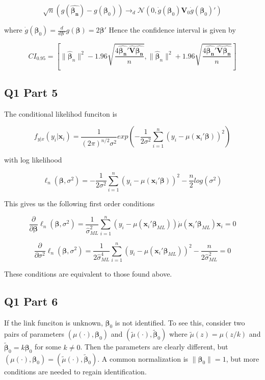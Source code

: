 \documentclass[11pt]{article}
\newcommand{\N}{\mathcal{N}}
\begin{document}
$$ \sqrt{n}(g(\hat{\bm{\beta_n}}) - g(\bm{\beta}_0)) \to_d \N (0, \dot{g}(\bm{\beta}_0) \bm{V}_0 \dot{g}(\bm{\beta}_0)')
$$

where $\dot{g}(\bm{\beta}_0) = \frac{d}{d\bm{\beta}'}g(\bm{\beta}) = 2 \bm{\beta}' $ Hence the confidence interval is given by 


$$ CI_{0.95} = \left[ \lVert \hat{\bm{\beta}}_n \rVert ^2 - 1.96 \sqrt{\frac{4\hat{\bm{\beta_n}}'\hat{\bm{V}} \hat{\bm{\beta_n}} }{n}},  \lVert \hat{\bm{\beta}}_n \rVert ^2 + 1.96 \sqrt{\frac{4\hat{\bm{\beta_n}}'\hat{\bm{V}} \hat{\bm{\beta_n}} }{n}} \right] 
$$

\subsection{Q1 Part 5}
The conditional likelihod funciton is 

$$f_{y|x}(y_i|\bm{x}_i) = \frac{1}{(2\pi)^{n/2} \sigma^2} exp \left( -\frac{1}{2 \sigma^2} \sum_{i=1}^{n}(y_i - \mu(\bm{x}_i'\bm{\beta}))^2 \right)
$$

with log likelihood 

$$ \ell_n(\bm{\beta}, \sigma^2) = -\frac{1}{2\sigma^2} \sum_{i=1}^{n}(y_i - \mu(\bm{x}_i' \bm{\beta}))^2 - \frac{n}{2}log(\sigma^2)
$$

This gives us the following first order conditions 

$$ \frac{\partial}{\partial \bm{\beta}} \ell_n(\bm{\beta}, \sigma^2) = \frac{1}{\hat{\sigma}_{ML}^2} \sum_{i=1}^{n}(y_i - \mu(\bm{x}_i' \bm{\beta}_{ML}))\dot{\mu}(\bm{x}_i' \bm{\beta}_{ML})\bm{x}_i = 0
$$

$$\frac{\partial}{\partial \sigma^2} \ell_n(\bm{\beta}, \sigma^2) =
\frac{1}{2\hat{\sigma}_{ML}^4} \sum_{i=1}^{n}(y_i - \mu(\bm{x}_i' \bm{\beta}_{ML}))^2 - \frac{n}{2 \hat{\sigma}_{ML}^2} =0
$$

These conditions are equivalent to those found above. 

\subsection{Q1 Part 6}
If the link funciton is unknown, $\bm{\beta}_0$ is not identified. To see this, consider two pairs of parameters $(\mu(\cdot), \bm{\beta}_0)$ and $(\tilde{\mu}(\cdot), \tilde{\bm{\beta}}_0)$ where $\tilde{\mu}(z) = \mu(z/k)$ and $\tilde{\bm{\beta}}_0 = k\bm{\beta}_0$ for some $ k \ne 0$. Then the parameters are clearly different, but $(\mu(\cdot), \bm{\beta}_0) = (\tilde{\mu}(\cdot), \tilde{\bm{\beta}}_0)$. A common normalization is $\lVert \bm{\beta}_0 \rVert = 1$, but more conditions are needed to regain identification.
\end{document}
